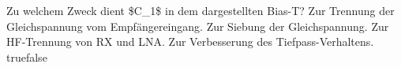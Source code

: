     {Zu welchem Zweck dient \$C\_1\$ in dem dargestellten Bias-T?}
    {Zur Trennung der Gleichspannung vom Empfängereingang.}
    {Zur Siebung der Gleichspannung.}
    {Zur HF-Trennung von RX und LNA.}
    {Zur Verbesserung des Tiefpass-Verhaltens.}
    {true}{false}